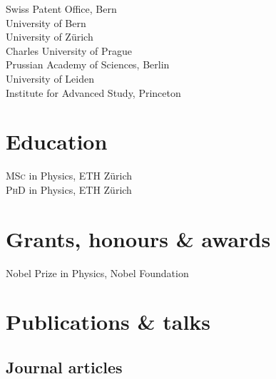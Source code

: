 \documentclass[12pt]{article} %
\begin{document}
Swiss Patent Office, Bern\\
University of Bern\\
University of Zürich\\
Charles University of Prague\\
Prussian Academy of Sciences, Berlin\\
University of Leiden\\
Institute for Advanced Study, Princeton


\section*{Education}

\textsc{MSc} in Physics, ETH Zürich\\
\textsc{PhD} in Physics, ETH Zürich


\section*{Grants, honours \& awards}

Nobel Prize in Physics, Nobel Foundation


\section*{Publications \& talks}

\subsection*{Journal articles}
\end{document}
